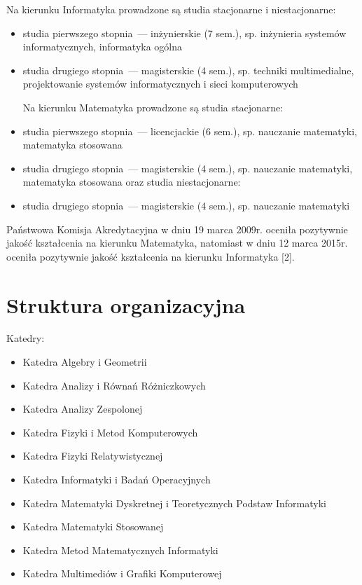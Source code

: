 \documentclass[a4paper,12pt]{article}
\begin{document}
Na kierunku Informatyka prowadzone są studia stacjonarne i niestacjonarne:

\begin{itemize}

\item studia pierwszego stopnia~--– inżynierskie (7 sem.), sp. inżynieria systemów informatycznych, informatyka
ogólna

\item studia drugiego stopnia~--– magisterskie (4 sem.), sp. techniki multimedialne, projektowanie systemów
informatycznych i sieci komputerowych

Na kierunku Matematyka prowadzone są studia stacjonarne:

\item studia pierwszego stopnia~--– licencjackie (6 sem.), sp. nauczanie matematyki, matematyka stosowana

\item studia drugiego stopnia~--– magisterskie (4 sem.), sp. nauczanie matematyki, matematyka stosowana
oraz studia niestacjonarne:

\item studia drugiego stopnia~--– magisterskie (4 sem.), sp. nauczanie matematyki

\end{itemize}

Państwowa Komisja Akredytacyjna w dniu 19 marca 2009r. oceniła pozytywnie jakość kształcenia na kierunku
Matematyka, natomiast w dniu 12 marca 2015r. oceniła pozytywnie jakość kształcenia na kierunku
Informatyka [2].

\section{Struktura organizacyjna}

Katedry:

\begin{itemize}

\item Katedra Algebry i Geometrii

\item Katedra Analizy i Równań Różniczkowych

\item Katedra Analizy Zespolonej

\item Katedra Fizyki i Metod Komputerowych

\item Katedra Fizyki Relatywistycznej

\item Katedra Informatyki i Badań Operacyjnych

\item Katedra Matematyki Dyskretnej i Teoretycznych Podstaw Informatyki

\item Katedra Matematyki Stosowanej

\item Katedra Metod Matematycznych Informatyki

\item Katedra Multimediów i Grafiki Komputerowej

\end{itemize}
\end{document}
